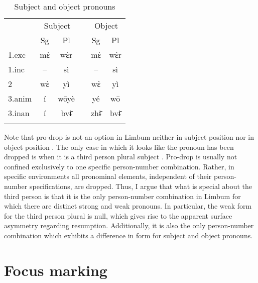 \documentclass[output=paper]{langscibook}
\begin{document}
\begin{table}
\caption{Subject and object pronouns}
\label{tab:johanneshein:subjectobjectpronouns}
\begin{tabular}{lcclcc}
  \lsptoprule
  &\multicolumn{2}{c}{Subject}&&\multicolumn{2}{c}{Object}\\
  \cmidrule{2-3}\cmidrule{5-6}
  &Sg&Pl&&Sg&Pl\\
  \midrule
  1.exc&mὲ&wὲr&&mὲ&wὲr\\
  1.inc&--&sì&&--&sì\\
  2&wὲ&yì&&wὲ&yì\\
  3.anim&í&wōyè&&yé&wō\\
  3.inan&í&bvɨ̄&&zhɨ̄&bvɨ̄\\
  \lspbottomrule
\end{tabular}
\end{table}

Note that pro-drop is not an option in Limbum neither in subject
position  nor in object position .
The only case in which it looks like the pronoun has been dropped is
when it is a third person plural subject .
Pro-drop is usually not confined exclusively to one specific
person-number combination. Rather, in specific environments all
pronominal elements, independent of their person-number
specifications, are dropped. Thus, I argue that what is special about
the third person is that it is the only person-number combination in
Limbum for which there are distinct strong and weak pronouns. In particular,
the weak form for the third person plural is null, which gives rise to
the apparent surface asymmetry regarding resumption. Additionally, it is also the only person-number combination which exhibits a difference in form for subject and object pronouns.

\section{Focus marking}
\label{sec:johanneshein:focus-movement}
\end{document}
